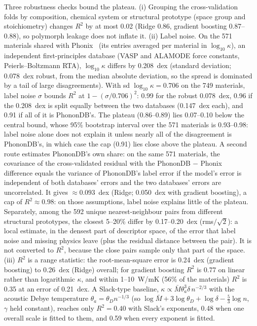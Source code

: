 \documentclass[aps,prm,reprint,onecolumn,groupedaddress]{revtex4-2}
\begin{document}
Three robustness checks bound the plateau. (i) Grouping the cross-validation folds by composition, chemical system or structural prototype (space group and stoichiometry) changes $R^2$ by at most 0.02 (Ridge 0.86, gradient boosting 0.87--0.88), so polymorph leakage does not inflate it. (ii) Label noise. On the 571 materials shared with Phonix~\cite{ohnishi2026} (its entries averaged per material in $\log_{10}\kappa$), an independent first-principles database (VASP and ALAMODE force constants, Peierls--Boltzmann RTA), $\log_{10}\kappa$ differs by 0.208~dex (standard deviation; 0.078~dex robust, from the median absolute deviation, so the spread is dominated by a tail of large disagreements). With sd $\log_{10}\kappa = 0.706$ on the 749 materials, label noise $\sigma$ bounds $R^2$ at $1 - (\sigma/0.706)^2$: 0.99 for the robust 0.078~dex, 0.96 if the 0.208~dex is split equally between the two databases (0.147~dex each), and 0.91 if all of it is PhononDB's. The plateau (0.86--0.89) lies 0.07--0.10 below the central bound, whose 95\% bootstrap interval over the 571 materials is 0.93--0.98: label noise alone does not explain it unless nearly all of the disagreement is PhononDB's, in which case the cap (0.91) lies close above the plateau. A second route estimates PhononDB's own share: on the same 571 materials, the covariance of the cross-validated residual with the PhononDB $-$ Phonix difference equals the variance of PhononDB's label error if the model's error is independent of both databases' errors and the two databases' errors are uncorrelated. It gives $\approx 0.093$~dex (Ridge; 0.050~dex with gradient boosting), a cap of $R^2 \approx 0.98$: on those assumptions, label noise explains little of the plateau. Separately, among the 592 unique nearest-neighbour pairs from different structural prototypes, the closest 5--20\% differ by 0.17--0.20~dex (rms$/\sqrt{2}$): a local estimate, in the densest part of descriptor space, of the error that label noise and missing physics leave (plus the residual distance between the pair). It is not converted to $R^2$, because the close pairs sample only that part of the space. (iii) $R^2$ is a range statistic: the root-mean-square error is 0.24~dex (gradient boosting) to 0.26~dex (Ridge) overall; for gradient boosting $R^2$ is 0.77 on linear rather than logarithmic $\kappa$, and within 1--10~W/mK (56\% of the materials) $R^2$ is 0.35 at an error of 0.21~dex. A Slack-type baseline, $\kappa \propto \bar M \theta_a^3 \delta\, n^{-2/3}$ with the acoustic Debye temperature $\theta_a = \theta_D n^{-1/3}$ (so $\log \bar M + 3\log\theta_D + \log\delta - \tfrac{5}{3}\log n$, $\gamma$ held constant), reaches only $R^2 = 0.40$ with Slack's exponents, 0.48 when one overall scale is fitted to them, and 0.59 when every exponent is fitted.
\end{document}
